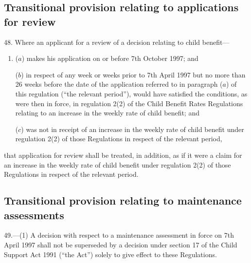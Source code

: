\documentclass[12pt,a4paper]{article}
\begin{document}
\subsection[48. Transitional provision relating to applications for review]{Transitional provision relating to applications for review}

48.  Where an applicant for a review of a decision relating to child benefit—
\begin{enumerate}\item[]
($a$) makes his application on or before 7th October 1997; and

($b$) in respect of any week or weeks prior to 7th April 1997 but no more than 26 weeks before the date of the application referred to in paragraph ($a$) of this regulation (“the relevant period”), would have satisfied the conditions, as were then in force, in regulation 2(2) of the Child Benefit Rates Regulations relating to an increase in the weekly rate of child benefit; and

($c$) was not in receipt of an increase in the weekly rate of child benefit under regulation 2(2) of those Regulations in respect of the relevant period,
\end{enumerate}
that application for review shall be treated, in addition, as if it were a claim for an increase in the weekly rate of child benefit under regulation 2(2) of those Regulations in respect of the relevant period.

\subsection[49. Transitional provision relating to maintenance assessments]{Transitional provision relating to maintenance assessments}


49.—(1) A decision with respect to a maintenance assessment in force on 7th April 1997 shall not be superseded by a decision under section 17 of the Child Support Act 1991 (“the Act”) solely to give effect to these Regulations.
\end{document}
